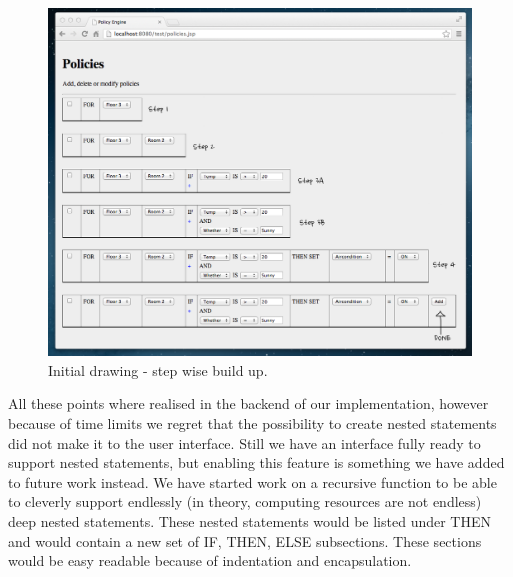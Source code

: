 \begin{figure}[ht]
\centering
\includegraphics[width=\columnwidth]{building_policy_steps.png}
\caption{Initial drawing - step wise build up.}
\label{fig:initialidea:policysteps}
\end{figure}

All these points where realised in the backend of our implementation, however because of time limits we regret that the possibility to create nested statements did not make it to the user interface. Still we have an interface fully ready to support nested statements, but enabling this feature is something we have added to future work instead. We have started work on a recursive function to be able to cleverly support endlessly (in theory, computing resources are not endless) deep nested statements. These nested statements would be listed under THEN and would contain a new set of IF, THEN, ELSE subsections. These sections would be easy readable because of indentation and encapsulation.

